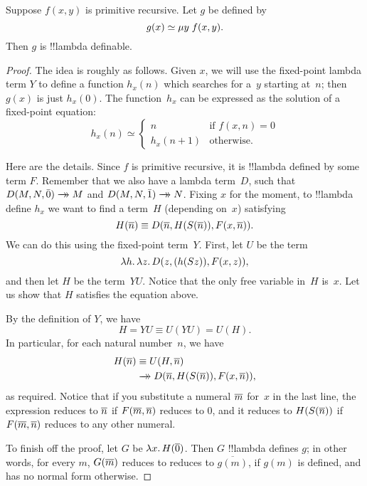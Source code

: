 \documentclass[../../../include/open-logic-section]{subfiles}
\begin{document}

\begin{lem}
Suppose $f(x,y)$ is primitive recursive. Let $g$ be defined by
\[
g(x) \simeq \mu y \; f(x,y).
\]
Then $g$ is !!{lambda definable}.
\end{lem}

\begin{proof}
The idea is roughly as follows. Given $x$, we will use the fixed-point
lambda term $Y$ to define a function $h_x(n)$ which searches for a~$y$
starting at~$n$; then $g(x)$ is just $h_x(0)$. The function~$h_x$ can
be expressed as the solution of a fixed-point equation:
\[
h_x(n) \simeq
\begin{cases}
n & \text{if $f(x,n) = 0$} \\
h_x(n+1) & \text{otherwise.}
\end{cases}
\]

Here are the details. Since $f$ is primitive recursive, it is
!!{lambda defined} by some term $F$. Remember that we also have a lambda
term~$D$, such that $D(M, N, \bar{0}) \red M$ and $D(M, N, \bar{1})
\red N$. Fixing $x$ for the moment, to !!{lambda define} $h_x$ we want to
find a term~$H$ (depending on~$x$) satisfying
\[
H(\overline{n}) \equiv D(\overline{n}, H(S(\overline{n})), F(x, \overline{n})).
\]
We can do this using the fixed-point term~$Y$. First, let $U$ be the
term
\[
\lambd[h][\lambd[z][D(z,(h(Sz)),F(x,z))]],
\]
and then let $H$ be the term~$YU$. Notice that the only free variable
in~$H$ is~$x$. Let us show that $H$ satisfies the equation above.

By the definition of $Y$, we have
\[
H = YU \equiv U(YU) = U(H).
\]
In particular, for each natural number~$n$, we have
\begin{align*}
H(\num{n}) & \equiv U(H, \num{n}) \\
& \red D(\num{n}, H(S(\num{n})), F(x, \num{n})),
\end{align*}
as required. Notice that if you substitute a numeral $\overline{m}$ for~$x$
in the last line, the expression reduces to $\overline{n}$ if $F(\overline{m},
\overline{n})$ reduces to $\num{0}$, and it reduces to $H(S(\overline{n}))$ if
$F(\overline{m}, \overline{n})$ reduces to any other numeral.

To finish off the proof, let $G$ be $\lambd[x][H(\num 0)]$. Then $G$
!!{lambda define}s $g$; in other words, for every $m$, $G(\overline{m})$ reduces to
reduces to $\overline {g(m)}$, if $g(m)$ is defined, and has no
normal form otherwise.
\end{proof}
\end{document}
